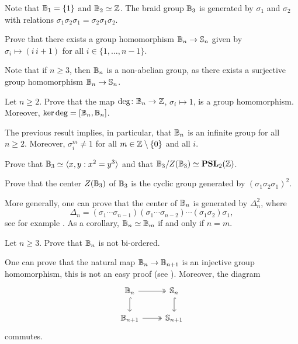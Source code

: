 Note that $\mathbb{B}_1=\{1\}$ and $\mathbb{B}_2\simeq\mathbb{Z}$. The braid 
group $\mathbb{B}_3$ is generated by
$\sigma_1$ and $\sigma_2$ with relations
$\sigma_1\sigma_2\sigma_1=\sigma_2\sigma_1\sigma_2$.

\begin{exercise}
    Prove that there exists a group homomorphism $\mathbb{B}_n\to\mathbb{S}_n$ 
    given by $\sigma_i\mapsto (i\,i+1)$ for all $i\in\{1,\dots,n-1\}$. 
\end{exercise}

Note that if $n\geq3$, then 
$\mathbb{B}_n$ is a non-abelian group, as there exists a surjective
group homomorphism $\mathbb{B}_n\to\mathbb{S}_n$. 

\begin{exercise}
    Let $n\geq 2$. 
    Prove that the map $\deg\colon\mathbb{B}_n\to\mathbb{Z}$, $\sigma_i\mapsto 1$, 
    is a group homomorphism. Moreover, $\ker\deg=[\mathbb{B}_n,\mathbb{B}_n]$. 
\end{exercise}

The previous result implies, in particular, that $\mathbb{B}_n$ is an infinite 
group for all $n\geq2$. Moreover, $\sigma_i^m\ne1$ for all $m\in\mathbb{Z}\setminus\{0\}$ and all $i$.  

\begin{exercise}
    Prove that $\mathbb{B}_3\simeq\langle x,y:x^2=y^3\rangle$ and that 
    $\mathbb{B}_3/Z(\mathbb{B}_3)\simeq\mathbf{PSL}_2(\mathbb{Z})$. 
\end{exercise}

\begin{exercise}
    Prove that the center $Z(\mathbb{B}_3)$ of $\mathbb{B}_3$ is
    the cyclic group generated by $(\sigma_1\sigma_2\sigma_1)^2$.
\end{exercise}

More generally, one can prove that
the center of $\mathbb{B}_n$ is generated by $\Delta_n^2$, where
\[
\Delta_n=(\sigma_1\cdots\sigma_{n-1})(\sigma_1\cdots\sigma_{n-2})\cdots(\sigma_1\sigma_2)\sigma_1, 
\]
see for example \cite[Theorem 1.24]{MR2435235}. 
As a corollary, $\mathbb{B}_n\simeq\mathbb{B}_m$ if and only if $n=m$. 

\begin{exercise}
\label{xca:Bn_notBO}
    Let $n\geq3$. 
    Prove that $\mathbb{B}_n$ is not bi-ordered. 
\end{exercise}

One can prove that 
the natural map $\mathbb{B}_n\to\mathbb{B}_{n+1}$ is an injective group homomorphism, this is not an easy proof (see \cite[Corollary 1.14]{MR2435235}). Moreover,
the diagram
\[\begin{tikzcd}
	\B_n & \Sym_n \\
	\B_{n+1} & \Sym_{n+1}
	\arrow[two heads, from=1-1, to=1-2]
	\arrow[hook, from=1-2, to=2-2]
	\arrow[hook, from=1-1, to=2-1]
	\arrow[two heads, from=2-1, to=2-2]
\end{tikzcd}
\]
commutes. 

